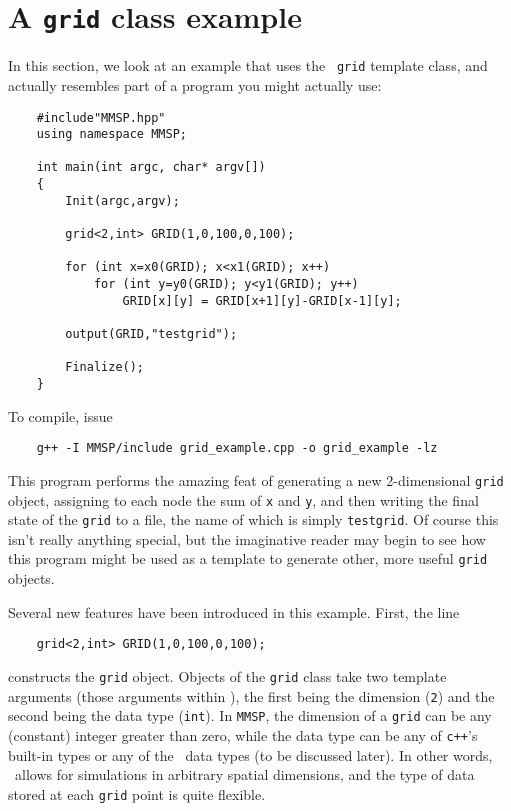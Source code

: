 \section{A {\tt grid} class example}
In this section, we look at an example that uses the \MMSP\ {\tt grid} template class, and actually resembles part of a program you might actually use:
\begin{shadebox}
\begin{verbatim}
    #include"MMSP.hpp"
    using namespace MMSP;

    int main(int argc, char* argv[])
    {
        Init(argc,argv);

        grid<2,int> GRID(1,0,100,0,100);

        for (int x=x0(GRID); x<x1(GRID); x++)
            for (int y=y0(GRID); y<y1(GRID); y++)
                GRID[x][y] = GRID[x+1][y]-GRID[x-1][y];

        output(GRID,"testgrid");

        Finalize();
    }
\end{verbatim}
\end{shadebox}
To compile, issue
\begin{shadebox}
\begin{verbatim}
    g++ -I MMSP/include grid_example.cpp -o grid_example -lz
\end{verbatim}
\end{shadebox}
This program performs the amazing feat of generating a new 2-dimensional {\tt grid} object, assigning to each node the sum of {\tt x} and {\tt y}, and then writing the final state of the {\tt grid} to a file, the name of which is simply {\tt testgrid}.  Of course this isn't really anything special, but the imaginative reader may begin to see how this program might be used as a template to generate other, more useful {\tt grid} objects.

Several new features have been introduced in this example.  First, the line
\begin{shadebox}
\begin{verbatim}
    grid<2,int> GRID(1,0,100,0,100);
\end{verbatim}
\end{shadebox}
constructs the {\tt grid} object.  Objects of the {\tt grid} class take two template arguments (those arguments within {\tt < >}), the first being the dimension ({\tt 2}) and the second being the data type ({\tt int}).  In {\tt MMSP}, the dimension of a {\tt grid} can be any (constant) integer greater than zero, while the data type can be any of {\tt c++}'s built-in types or any of the \MMSP\ data types (to be discussed later).  In other words, \MMSP\ allows for simulations in arbitrary spatial dimensions, and the type of data stored at each {\tt grid} point is quite flexible.

